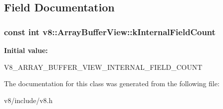 \subsection{Field Documentation}
\hypertarget{classv8_1_1ArrayBufferView_a1cccb675b1a91e61411fee5918d451db}{
\subsubsection[{k\-Internal\-Field\-Count}]{\setlength{\rightskip}{0pt plus 5cm}const int v8\-::\-Array\-Buffer\-View\-::k\-Internal\-Field\-Count\hspace{0.3cm}{\ttfamily [static]}}}\label{classv8_1_1ArrayBufferView_a1cccb675b1a91e61411fee5918d451db}
{\bfseries Initial value\-:}
\begin{DoxyCode}

      V8\_ARRAY\_BUFFER\_VIEW\_INTERNAL\_FIELD\_COUNT
\end{DoxyCode}


The documentation for this class was generated from the following file\-:\begin{DoxyCompactItemize}
\item 
v8/include/v8.\-h\end{DoxyCompactItemize}
